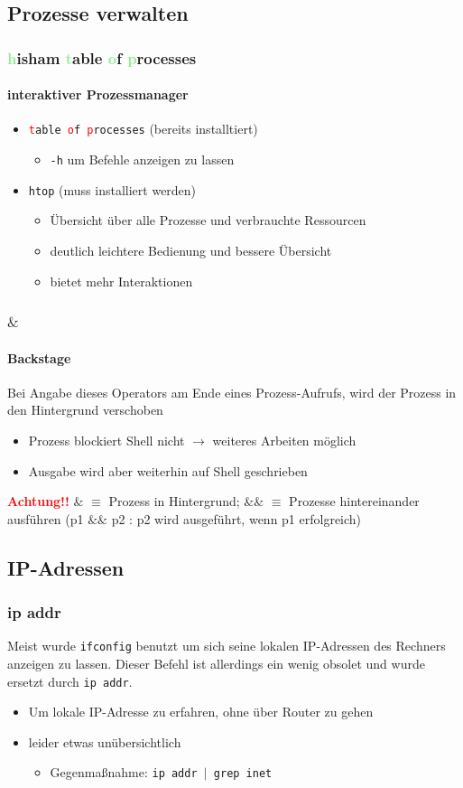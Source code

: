 \documentclass[12pt,utf8]{beamer}
\begin{document}
\subsection{Prozesse verwalten}
\begin{frame}
\frametitle{\textcolor{lightGreen}{h}isham \textcolor{lightGreen}{t}able \textcolor{lightGreen}{o}f \textcolor{lightGreen}{p}rocesses}
\framesubtitle{interaktiver Prozessmanager}
\begin{itemize}
	\item \texttt{\textcolor{red}{t}able \textcolor{red}{o}f \textcolor{red}{p}rocesses} (bereits installtiert)
	\begin{itemize}[<+->]
		\item {\scriptsize \texttt{-h} um Befehle anzeigen zu lassen}
	\end{itemize}
	\item \texttt{htop} (muss installiert werden)
	\begin{itemize}[<+->]
		\item {\scriptsize Übersicht über alle Prozesse und verbrauchte Ressourcen}
		\item {\scriptsize deutlich leichtere Bedienung und bessere Übersicht}
		\item {\scriptsize bietet mehr Interaktionen}
	\end{itemize}
\end{itemize}
\end{frame}

\begin{frame}
\frametitle{$\&$}
\framesubtitle{Backstage}
Bei Angabe dieses Operators am Ende eines Prozess-Aufrufs, wird der Prozess in den Hintergrund verschoben
\begin{itemize}
	\item Prozess blockiert Shell nicht $\to$ weiteres Arbeiten möglich
	\item Ausgabe wird aber weiterhin auf Shell geschrieben
\end{itemize}
\textbf{\textcolor{red}{Achtung!!}} $\&$ $\equiv$ Prozess in Hintergrund; $\&\&$ $\equiv$ Prozesse hintereinander ausführen (p1 $\&\&$ p2 : p2 wird ausgeführt, wenn p1 erfolgreich)
\end{frame}

\subsection{IP-Adressen}
\begin{frame}
	\frametitle{ip addr}
	Meist wurde \texttt{ifconfig} benutzt um sich seine lokalen IP-Adressen des Rechners anzeigen zu lassen. Dieser Befehl ist allerdings ein wenig obsolet und wurde ersetzt durch \texttt{ip addr}.
	\begin{itemize}
		\item Um lokale IP-Adresse zu erfahren, ohne über Router zu gehen
		\item leider etwas unübersichtlich
		\begin{itemize}
			\item {\scriptsize Gegenmaßnahme: \texttt{ip addr $\mid$ grep inet}}
		\end{itemize}
	\end{itemize}
\end{frame}
\end{document}
